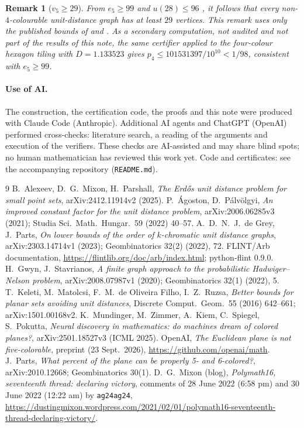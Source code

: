 \documentclass[10pt,a4paper]{article}
\newtheorem*{remark}{Remark}
\begin{document}
\begin{remark}[$v_5\ge29$]
From $e_5\ge99$ \cite{dGP} and $u(28)\le96$ \cite[Thm.~1(b)]{AMP}, it follows that every
non-$4$-colourable unit-distance graph has at least $29$ vertices. This remark uses only the published
bounds of \cite{dGP} and \cite{AMP}. As a secondary computation, not audited and not part of the
results of this note, the same certifier applied to the four-colour hexagon tiling with $D=1.133523$
gives $p_4\le101531397/10^{10}<1/98$, consistent with $e_5\ge99$.
\end{remark}

\paragraph{Use of AI.} The construction, the certification code, the proofs and this note were
produced with Claude Code (Anthropic). Additional AI agents and ChatGPT (OpenAI) performed
cross-checks: literature search, a reading of the arguments and execution of the verifiers. These checks are AI-assisted and may share blind spots; no
human mathematician has reviewed this work yet.
Code and certificates: see the accompanying repository (\texttt{README.md}).

\begin{thebibliography}{9}\small
{} B.~Alexeev, D.~G.~Mixon, H.~Parshall, \emph{The Erd\H{o}s unit distance problem for small
point sets}, arXiv:2412.11914v2 (2025).
 P.~\'Agoston, D.~P\'alv\"olgyi, \emph{An improved constant factor for the unit distance
problem}, arXiv:2006.06285v3 (2021); Studia Sci.\ Math.\ Hungar.\ 59 (2022) 40--57.
 A.~D.~N.~J.~de Grey, J.~Parts, \emph{On lower bounds of the order of $k$-chromatic unit
distance graphs}, arXiv:2303.14714v1 (2023); Geombinatorics 32(2) (2022), 72.
 FLINT/Arb documentation, \url{https://flintlib.org/doc/arb/index.html}; python-flint 0.9.0.
 H.~Gwyn, J.~Stavrianos, \emph{A finite graph approach to the probabilistic
Hadwiger--Nelson problem}, arXiv:2008.07987v1 (2020); Geombinatorics 32(1) (2022), 5.
 T.~Keleti, M.~Matolcsi, F.~M.~de Oliveira Filho, I.~Z.~Ruzsa, \emph{Better bounds for planar
sets avoiding unit distances}, Discrete Comput.\ Geom.\ 55 (2016) 642--661; arXiv:1501.00168v2.
 K.~Mundinger, M.~Zimmer, A.~Kiem, C.~Spiegel, S.~Pokutta, \emph{Neural discovery in
mathematics: do machines dream of colored planes?}, arXiv:2501.18527v3 (ICML 2025).
 OpenAI, \emph{The Euclidean plane is not five-colorable}, preprint (23 Sept.\ 2026),
\url{https://github.com/openai/math}.
 J.~Parts, \emph{What percent of the plane can be properly 5- and 6-colored?},
arXiv:2010.12668; Geombinatorics 30(1).
 D.~G.~Mixon (blog), \emph{Polymath16, seventeenth thread: declaring victory}, comments of
28 June 2022 (6:58 pm) and 30 June 2022 (12:22 am) by \texttt{ag24ag24},
\url{https://dustingmixon.wordpress.com/2021/02/01/polymath16-seventeenth-thread-declaring-victory/}.
\end{thebibliography}
\end{document}
